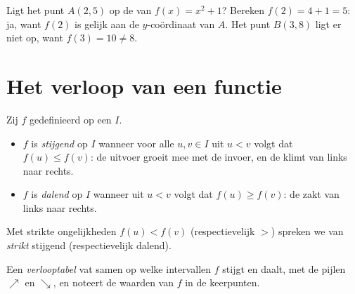 \begin{example}\label{ex:g10:functions:membership}
Ligt het punt $A(2, 5)$ op de  van $f(x) = x^2 + 1$? Bereken
$f(2) = 4 + 1 = 5$: ja, want $f(2)$ is gelijk aan de $y$-coördinaat van $A$.
Het punt $B(3, 8)$ ligt er niet op, want $f(3) = 10 \neq 8$.
\end{example}

\section{Het verloop van een functie}

\begin{definition}\label{def:g10:functions:variations}
Zij $f$ gedefinieerd op een  $I$.
\begin{itemize}
  \item $f$ is \emph{stijgend} op $I$ wanneer voor
        alle $u, v \in I$ uit $u < v$ volgt dat $f(u) \leq f(v)$: de
        uitvoer groeit mee met de invoer, en de  klimt van links naar
        rechts.
  \item $f$ is \emph{dalend} op $I$ wanneer uit
        $u < v$ volgt dat $f(u) \geq f(v)$: de  zakt van links naar
        rechts.
\end{itemize}
Met strikte ongelijkheden $f(u) < f(v)$ (respectievelijk $>$) spreken we van
\emph{strikt} stijgend (respectievelijk dalend).
\end{definition}

\begin{definition}[Verlooptabel]\label{def:g10:functions:table}
Een \emph{verlooptabel} vat samen op welke intervallen
$f$ stijgt en daalt, met de pijlen $\nearrow$ en $\searrow$, en noteert de
waarden van $f$ in de keerpunten.
\end{definition}

